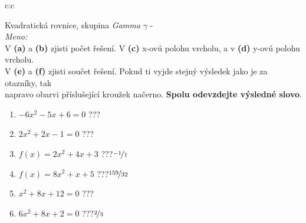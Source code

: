 \documentclass[10pt]{report}
\begin{document}
\clearpage
\thispagestyle{empty}
\begin{tabular}{c:c}
\begin{minipage}[c][99mm][t]{0.49\linewidth}
\begin{center}
\vspace{7mm}
{\huge Kvadratická rovnice, skupina \textit{Gamma $\gamma$} -}\\[4.5mm]
\textit{Meno:}\phantom{xxxxxxxxxxxxxxxxxxxxxxxxxxxxxxxxxxxxxxxxxxxxxxxxxxxxxxxxxxxxxxxxx}\\[3.5mm]
V \textbf{(a)} a \textbf{(b)} zjisti počet řešení. V \textbf{(c)} x-ovú polohu vrcholu, a v \textbf{(d)} y-ovú polohu vrcholu.\\V \textbf{(e)} a \textbf{(f)} zjisti součet řešení. Pokud ti vyjde stejný výsledek jako je za otazníky, tak\\napravo obarvi příslušející kroužek načerno. \textbf{Spolu odevzdejte výsledné slovo}.\\[3mm]
\begin{minipage}{0.77\linewidth}
\begin{center}
\begin{varwidth}{\textwidth}
\begin{enumerate}
\large
\item $-6x^2-5x+6=0$\quad \dotfill\; ???\;\dotfill {}
\item $2x^2+2x-1=0$\quad \dotfill\; ???\;\dotfill {}
\item $f(x)=2x^2+4x+3$\quad \dotfill\; ???\;\dotfill \quad $\nicefrac{-1}{1}$
\item $f(x)=8x^2+x+5$\quad \dotfill\; ???\;\dotfill \quad $\nicefrac{159}{32}$
\item $x^2+8x+12=0$\quad \dotfill\; ???\;\dotfill {}
\item $6x^2+8x+2=0$\quad \dotfill\; ???\;\dotfill \quad $\nicefrac{2}{3}$
\end{enumerate}
\end{varwidth}
\end{center}
\end{minipage}

\end{center}
\end{minipage}
\end{tabular}
\end{document}
